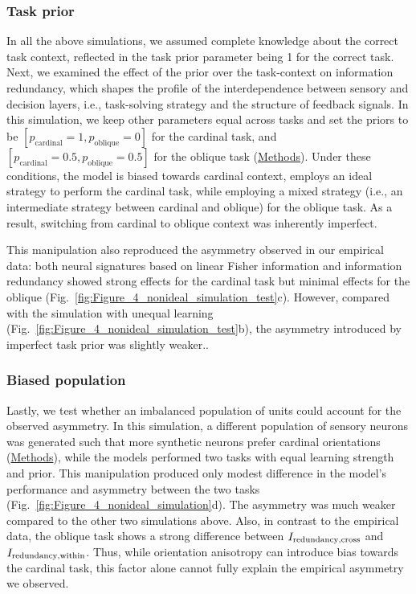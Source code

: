 \documentclass[lineno,pdflatex,sn-basic]{sn-jnl}%
\newcommand{\Ideltawithin}{I_{\rm redundancy,within}}
\newcommand{\Ideltacross}{I_{\rm redundancy,cross}}
\theoremstyle{thmstyleone}%
\theoremstyle{thmstyletwo}%
\theoremstyle{thmstylethree}%
\begin{document}
\subsubsection{Task prior}
In all the above simulations, we assumed complete knowledge about the correct task context, reflected in the task prior parameter being 1 for the correct task. Next, we examined the effect of the prior over the task-context on information redundancy, which shapes the profile of the interdependence between sensory and decision layers, i.e., task-solving strategy and the structure of feedback signals. In this simulation, we keep other parameters equal across tasks and set the priors to be $[p_\textrm{cardinal} = 1, p_\textrm{oblique} = 0]$ for the cardinal task, and $[p_\textrm{cardinal} = 0.5, p_\textrm{oblique} = 0.5]$ for the oblique task (\hyperref[sec_ch2:nonideal_simulation_test]{Methods}). Under these conditions, the model is biased towards cardinal context, employs an ideal strategy to perform the cardinal task, while employing a mixed strategy (i.e., an intermediate strategy between cardinal and oblique) for the oblique task. As a result, switching from cardinal to oblique context was inherently imperfect.

This manipulation also reproduced the asymmetry observed in our empirical data: both neural signatures based on linear Fisher information and information redundancy showed strong effects for the cardinal task but minimal effects for the oblique (Fig.~\ref{fig:Figure_4_nonideal_simulation_test}c). However, compared with the simulation with unequal learning (Fig.~\ref{fig:Figure_4_nonideal_simulation_test}b), the asymmetry introduced by imperfect task prior was slightly weaker..


\subsubsection{Biased population}  Lastly, we test whether an imbalanced population of units could account for the observed asymmetry. In this simulation, a different population of sensory neurons was generated such that more synthetic neurons prefer cardinal orientations (\hyperref[sec_ch2:nonideal_simulation_test]{Methods}), while the models performed two tasks with equal learning strength and prior. This manipulation produced only modest difference in the model's performance and asymmetry between the two tasks (Fig.~\ref{fig:Figure_4_nonideal_simulation}d). The asymmetry was much weaker compared to the other two simulations above. Also, in contrast to the empirical data, the oblique task shows a strong difference between $\Ideltacross$ and $\Ideltawithin$. Thus, while orientation anisotropy can introduce bias towards the cardinal task, this factor alone cannot fully explain the empirical asymmetry we observed.
\end{document}
